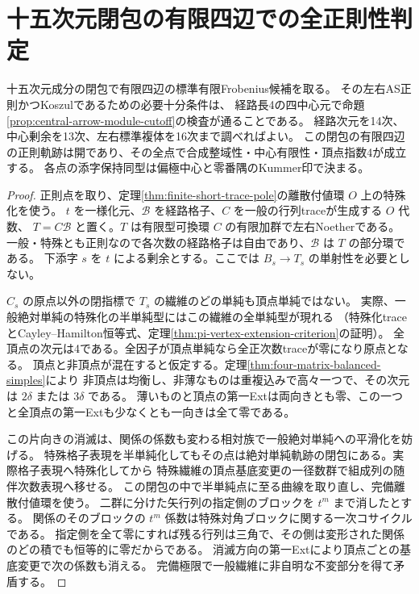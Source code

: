 \section{十五次元閉包の有限四辺での全正則性判定}
\label{sec:main-regular-specialization}
\begin{theorem}\label{thm:main-regular-specialization}
十五次元成分の閉包で有限四辺の標準有限Frobenius候補を取る。
その左右AS正則かつKoszulであるための必要十分条件は、
経路長4の四中心元で命題\ref{prop:central-arrow-module-cutoff}の検査が通ることである。
経路次元を14次、中心剰余を13次、左右標準複体を16次まで調べればよい。
この閉包の有限四辺の正則軌跡は開であり、その全点で合成整域性・中心有限性・頂点指数4が成立する。
各点の添字保持同型は偏極中心と零番隅のKummer印で決まる。
\end{theorem}
\begin{proof}
正則点を取り、定理\ref{thm:finite-short-trace-pole}の離散付値環 $O$ 上の特殊化を使う。
$t$ を一様化元、$\mathcal B$ を経路格子、$C$ を一般の行列traceが生成する $O$ 代数、
$T=C\mathcal B$ と置く。$T$ は有限型可換環 $C$ の有限加群で左右Noetherである。
一般・特殊とも正則なので各次数の経路格子は自由であり、$\mathcal B$ は $T$ の部分環である。
下添字 $s$ を $t$ による剰余とする。ここでは $B_s\to T_s$ の単射性を必要としない。

$C_s$ の原点以外の閉指標で $T_s$ の繊維のどの単純も頂点単純ではない。
実際、一般絶対単純の特殊化の半単純型にはこの繊維の全単純型が現れる
（特殊化traceとCayley--Hamilton恒等式、定理\ref{thm:pi-vertex-extension-criterion}の証明）。
全頂点の次元は4である。全因子が頂点単純なら全正次数traceが零になり原点となる。
頂点と非頂点が混在すると仮定する。定理\ref{thm:four-matrix-balanced-simples}により
非頂点は均衡し、非薄なものは重複込みで高々一つで、その次元は $2\delta$ または $3\delta$ である。
薄いものと頂点の第一Extは両向きとも零、この一つと全頂点の第一Extも少なくとも一向きは全て零である。

この片向きの消滅は、関係の係数も変わる相対族で一般絶対単純への平滑化を妨げる。
特殊格子表現を半単純化してもその点は絶対単純軌跡の閉包にある。実際格子表現へ特殊化してから
特殊繊維の頂点基底変更の一径数群で組成列の随伴次数表現へ移せる。
この閉包の中で半単純点に至る曲線を取り直し、完備離散付値環を使う。
二群に分けた矢行列の指定側のブロックを $t^m$ まで消したとする。
関係のそのブロックの $t^m$ 係数は特殊対角ブロックに関する一次コサイクルである。
指定側を全て零にすれば残る行列は三角で、その側は変形された関係のどの積でも恒等的に零だからである。
消滅方向の第一Extにより頂点ごとの基底変更で次の係数も消える。
完備極限で一般繊維に非自明な不変部分を得て矛盾する。


\end{proof}
